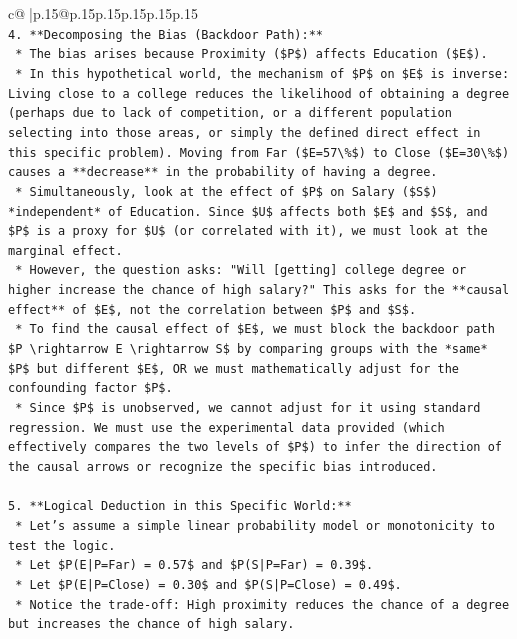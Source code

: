 \documentclass{article}
\begin{document}
{\begin{supertabular}{c@{$\;$}|p{.15\linewidth}@{}p{.15\linewidth}p{.15\linewidth}p{.15\linewidth}p{.15\linewidth}p{.15\linewidth}}
{{{\\ 
\texttt{4.  **Decomposing the Bias (Backdoor Path):**} \\
\texttt{    *   The bias arises because Proximity (\$P\$) affects Education (\$E\$).} \\
\texttt{    *   In this hypothetical world, the mechanism of \$P\$ on \$E\$ is inverse: Living close to a college reduces the likelihood of obtaining a degree (perhaps due to lack of competition, or a different population selecting into those areas, or simply the defined direct effect in this specific problem). Moving from Far (\$E=57\textbackslash{}\%\$) to Close (\$E=30\textbackslash{}\%\$) causes a **decrease** in the probability of having a degree.} \\
\texttt{    *   Simultaneously, look at the effect of \$P\$ on Salary (\$S\$) *independent* of Education. Since \$U\$ affects both \$E\$ and \$S\$, and \$P\$ is a proxy for \$U\$ (or correlated with it), we must look at the marginal effect.} \\
\texttt{    *   However, the question asks: "Will {[}getting{]} college degree or higher increase the chance of high salary?" This asks for the **causal effect** of \$E\$, not the correlation between \$P\$ and \$S\$.} \\
\texttt{    *   To find the causal effect of \$E\$, we must block the backdoor path \$P \textbackslash{}rightarrow E \textbackslash{}rightarrow S\$ by comparing groups with the *same* \$P\$ but different \$E\$, OR we must mathematically adjust for the confounding factor \$P\$.} \\
\texttt{    *   Since \$P\$ is unobserved, we cannot adjust for it using standard regression. We must use the experimental data provided (which effectively compares the two levels of \$P\$) to infer the direction of the causal arrows or recognize the specific bias introduced.} \\
\\ 
\texttt{5.  **Logical Deduction in this Specific World:**} \\
\texttt{    *   Let's assume a simple linear probability model or monotonicity to test the logic.} \\
\texttt{    *   Let \$P(E|P=Far) = 0.57\$ and \$P(S|P=Far) = 0.39\$.} \\
\texttt{    *   Let \$P(E|P=Close) = 0.30\$ and \$P(S|P=Close) = 0.49\$.} \\
\texttt{    *   Notice the trade{-}off: High proximity reduces the chance of a degree but increases the chance of high salary.} \\
}}}
\end{supertabular}}
\end{document}
